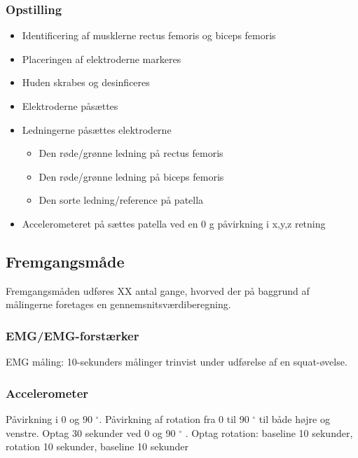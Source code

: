 \subsubsection{Opstilling}
\begin{itemize}
\item Identificering af musklerne rectus femoris og biceps femoris 
\item Placeringen af elektroderne markeres
\item Huden skrabes og desinficeres
\item Elektroderne påsættes
\item Ledningerne påsættes elektroderne
\begin{itemize}
\item Den røde/grønne ledning på rectus femoris
\item Den røde/grønne ledning på biceps femoris
\item Den sorte ledning/reference på patella 
\end{itemize} 
\item Accelerometeret på sættes patella ved en 0 g påvirkning i x,y,z retning
\end{itemize}


\subsection{Fremgangsmåde}
Fremgangsmåden udføres XX antal gange, hvorved der på baggrund af målingerne foretages en gennemsnitsværdiberegning.

\subsubsection{EMG/EMG-forstærker}
EMG måling: 10-sekunders målinger trinvist under udførelse af en squat-øvelse. 

\subsubsection{Accelerometer}
Påvirkning i 0 og 90 $^{\circ}$.
Påvirkning af rotation fra 0 til 90 $^{\circ}$ til både højre og venstre.
Optag 30 sekunder ved 0 og 90 $^{\circ}$ .
Optag rotation: baseline 10 sekunder, rotation 10 sekunder, baseline 10 sekunder




